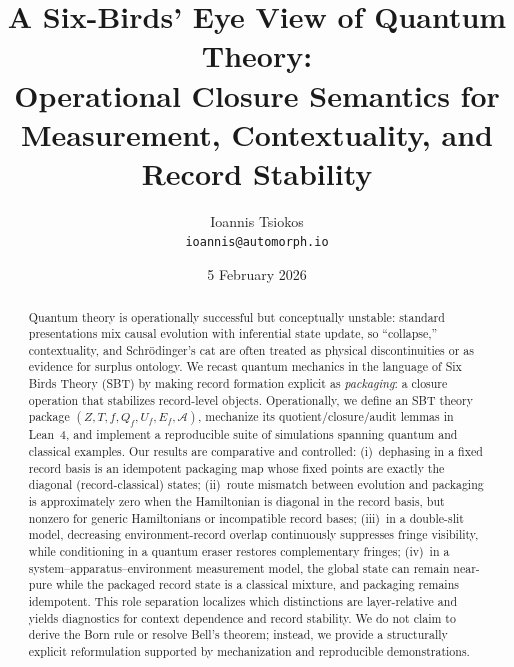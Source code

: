 \documentclass[11pt]{article}
\title{A Six-Birds' Eye View of Quantum Theory:\\Operational Closure Semantics for Measurement, Contextuality, and Record Stability}
\author{Ioannis Tsiokos\\\texttt{ioannis@automorph.io}}
\date{5 February 2026}
\begin{document}
\maketitle
\thispagestyle{firstpage}
\begin{abstract}
Quantum theory is operationally successful but conceptually unstable: standard presentations mix causal evolution with inferential state update, so ``collapse,'' contextuality, and Schr\"odinger's cat are often treated as physical discontinuities or as evidence for surplus ontology. We recast quantum mechanics in the language of Six Birds Theory (SBT) by making record formation explicit as \emph{packaging}: a closure operation that stabilizes record-level objects. Operationally, we define an SBT theory package $(Z,T,f,Q_f,U_f,E_f,\mathcal{A})$, mechanize its quotient/closure/audit lemmas in Lean~4, and implement a reproducible suite of simulations spanning quantum and classical examples.
Our results are comparative and controlled: (i)~dephasing in a fixed record basis is an idempotent packaging map whose fixed points are exactly the diagonal (record-classical) states; (ii)~route mismatch between evolution and packaging is approximately zero when the Hamiltonian is diagonal in the record basis, but nonzero for generic Hamiltonians or incompatible record bases; (iii)~in a double-slit model, decreasing environment-record overlap continuously suppresses fringe visibility, while conditioning in a quantum eraser restores complementary fringes; (iv)~in a system--apparatus--environment measurement model, the global state can remain near-pure while the packaged record state is a classical mixture, and packaging remains idempotent.
This role separation localizes which distinctions are layer-relative and yields diagnostics for context dependence and record stability. We do not claim to derive the Born rule or resolve Bell's theorem; instead, we provide a structurally explicit reformulation supported by mechanization and reproducible demonstrations.
\end{abstract}


\tableofcontents












\appendix






\end{document}

